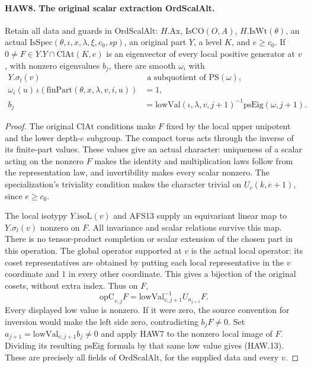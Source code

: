 \documentclass[11pt,a4paper]{article}
\numberwithin{equation}{section}
\theoremstyle{remark}\newtheorem{remark}[theorem]{Remark}
\begin{document}
\paragraph{HAW8. The original scalar extraction OrdScalAlt.}
\label{claim:HAW8}
Retain all data and guards in $\mathrm{OrdScalAlt}$:
$H.\mathrm{Ax}$, $\mathrm{IsCO}(O,A)$, $H.\mathrm{IsWt}(\theta)$,
an actual $\mathrm{IsSpec}(\theta,\iota,x,\lambda,\xi,c_0,sp)$,
an original part $Y$, a level $K$, and $e\ge c_0$.
If $0\ne F\in Y.Y\cap\mathrm{ClAt}(K,e)$ is an eigenvector
of every local positive generator at $v$, with nonzero
eigenvalues $b_j$, there are smooth $\omega_i$ with
\[
 \begin{split}
 Y.\sigma_l(v)&\text{ a subquotient of }\mathrm{PS}(\omega),\\
 \omega_i(u)\,\iota(\mathrm{finPart}(\theta,x,\lambda,v,i,u))&=1,\\
 b_j&=\mathrm{lowVal}(\iota,\lambda,v,j+1)^{-1}
                         \mathrm{psEig}(\omega,j+1).
 \end{split}
 \tag{HAW.13}
\]
\begin{proof}
The original $\mathrm{ClAt}$ conditions make $F$ fixed by
the local upper unipotent and the lower depth-$e$ subgroup.
The compact torus acts through the inverse of its finite-part
values.  These values give an actual character: uniqueness of
a scalar acting on the nonzero $F$ makes the identity and
multiplication laws follow from the representation law, and
invertibility makes every scalar nonzero.  The specialization's
triviality condition makes the character trivial on
$U_c(k,e+1)$, since $e\ge c_0$.

The local isotypy $Y.\mathrm{isoL}(v)$ and AFS13 supply an
equivariant linear map to $Y.\sigma_l(v)$ nonzero on $F$.
All invariance and scalar relations survive this map.  There
is no tensor-product completion or scalar extension of the
chosen part in this operation.  The global operator supported
at $v$ is the actual local operator: its coset representatives
are obtained by putting each local representative in the $v$
coordinate and $1$ in every other coordinate.  This gives
a bijection of the original cosets, without extra index.
Thus on $F$,
\[
 \mathrm{opC}_{v,j}F
       =\mathrm{lowVal}_{v,j+1}^{-1}U_{a_{j+1}}F.
\]
Every displayed low value is nonzero.  If it were zero, the
source convention for inversion would make the left side
zero, contradicting $b_jF\ne0$.  Set
$a_{j+1}=\mathrm{lowVal}_{v,j+1}b_j\ne0$ and apply HAW7 to
the nonzero local image of $F$.  Dividing its resulting
$\mathrm{psEig}$ formula by that same low value gives
(HAW.13).  These are precisely all fields of
$\mathrm{OrdScalAlt}$, for the supplied data and every $v$.
\end{proof}
\end{document}
